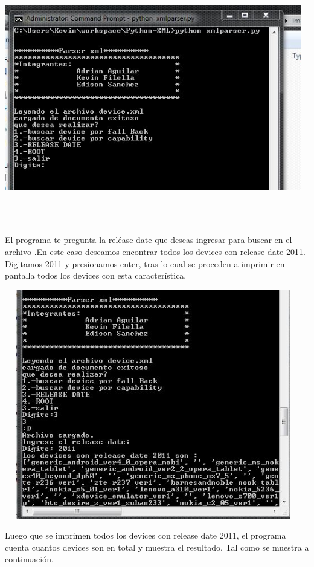 \documentclass[11pt]{article} %
\begin{document}
\includegraphics[width=13cm,height=11cm]{imagenes/mprincipal.jpg}


El programa te pregunta la reléase date que deseas ingresar para buscar en el archivo .En este caso deseamos encontrar todos los devices con release date 2011. Digitamos 2011 y presionamos enter, tras lo cual se proceden a imprimir en pantalla todos los devices con esta característica.


\includegraphics[width=13cm,height=10cm]{imagenes/usandorelease.jpg}

Luego que se imprimen todos los devices con release date 2011, el programa cuenta cuantos devices son en total y muestra el resultado. Tal como se muestra a continuación. 
\end{document}
